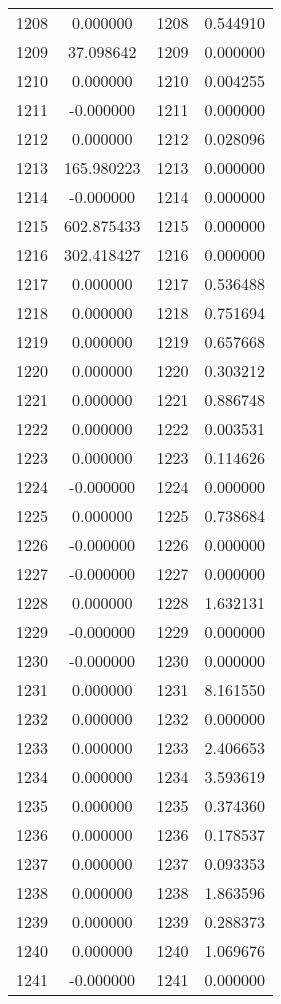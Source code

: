 \documentclass[12pt]{article}
\begin{document}
\begin{longtable}{@{}cccc@{}}
1208 & 0.000000 & 1208 & 0.544910 \\
1209 & 37.098642 & 1209 & 0.000000 \\
1210 & 0.000000 & 1210 & 0.004255 \\
1211 & -0.000000 & 1211 & 0.000000 \\
1212 & 0.000000 & 1212 & 0.028096 \\
1213 & 165.980223 & 1213 & 0.000000 \\
1214 & -0.000000 & 1214 & 0.000000 \\
1215 & 602.875433 & 1215 & 0.000000 \\
1216 & 302.418427 & 1216 & 0.000000 \\
1217 & 0.000000 & 1217 & 0.536488 \\
1218 & 0.000000 & 1218 & 0.751694 \\
1219 & 0.000000 & 1219 & 0.657668 \\
1220 & 0.000000 & 1220 & 0.303212 \\
1221 & 0.000000 & 1221 & 0.886748 \\
1222 & 0.000000 & 1222 & 0.003531 \\
1223 & 0.000000 & 1223 & 0.114626 \\
1224 & -0.000000 & 1224 & 0.000000 \\
1225 & 0.000000 & 1225 & 0.738684 \\
1226 & -0.000000 & 1226 & 0.000000 \\
1227 & -0.000000 & 1227 & 0.000000 \\
1228 & 0.000000 & 1228 & 1.632131 \\
1229 & -0.000000 & 1229 & 0.000000 \\
1230 & -0.000000 & 1230 & 0.000000 \\
1231 & 0.000000 & 1231 & 8.161550 \\
1232 & 0.000000 & 1232 & 0.000000 \\
1233 & 0.000000 & 1233 & 2.406653 \\
1234 & 0.000000 & 1234 & 3.593619 \\
1235 & 0.000000 & 1235 & 0.374360 \\
1236 & 0.000000 & 1236 & 0.178537 \\
1237 & 0.000000 & 1237 & 0.093353 \\
1238 & 0.000000 & 1238 & 1.863596 \\
1239 & 0.000000 & 1239 & 0.288373 \\
1240 & 0.000000 & 1240 & 1.069676 \\
1241 & -0.000000 & 1241 & 0.000000 \\

\end{longtable}
\end{document}

